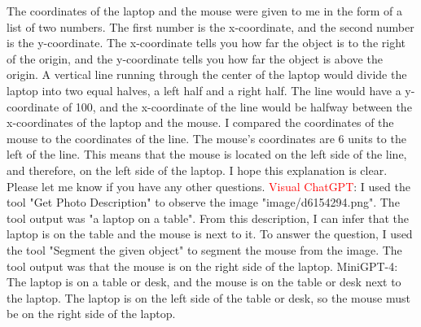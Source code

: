 \begin{enumerate}
        The coordinates of the laptop and the mouse were given to me in the form of a list of two numbers. The first number is the x-coordinate, and the second number is the y-coordinate. The x-coordinate tells you how far the object is to the right of the origin, and the y-coordinate tells you how far the object is above the origin.
        A vertical line running through the center of the laptop would divide the laptop into two equal halves, a left half and a right half. The line would have a y-coordinate of 100, and the x-coordinate of the line would be halfway between the x-coordinates of the laptop and the mouse.
        I compared the coordinates of the mouse to the coordinates of the line. The mouse's coordinates are 6 units to the left of the line. This means that the mouse is located on the left side of the line, and therefore, on the left side of the laptop.
        I hope this explanation is clear. Please let me know if you have any other questions.
        \subitem \textcolor{red}{Visual ChatGPT}: I used the tool "Get Photo Description" to observe the image "image/d6154294.png". The tool output was "a laptop on a table". From this description, I can infer that the laptop is on the table and the mouse is next to it. To answer the question, I used the tool "Segment the given object" to segment the mouse from the image. The tool output was that the mouse is on the right side of the laptop.
        \subitem MiniGPT-4: The laptop is on a table or desk, and the mouse is on the table or desk next to the laptop. The laptop is on the left side of the table or desk, so the mouse must be on the right side of the laptop.
    \end{enumerate}
